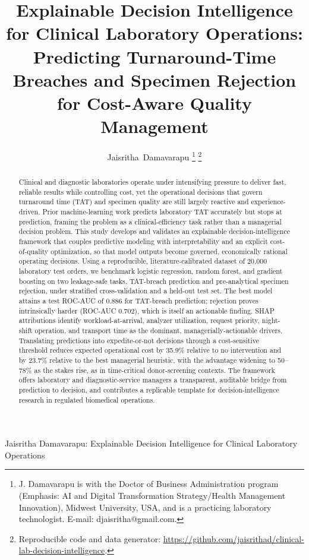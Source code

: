 \documentclass[journal]{IEEEtran}
\begin{document}
\title{Explainable Decision Intelligence for Clinical Laboratory Operations:
Predicting Turnaround-Time Breaches and Specimen Rejection for Cost-Aware
Quality Management}

\author{Jaisritha~Damavarapu%
\thanks{J. Damavarapu is with the Doctor of Business Administration program
(Emphasis: AI and Digital Transformation Strategy/Health Management Innovation), Midwest University, USA,
and is a practicing laboratory technologist.
E-mail: djaisritha@gmail.com.}%
\thanks{Reproducible code and data generator:
\url{https://github.com/jaisrithad/clinical-lab-decision-intelligence}.}}

%
{Jaisritha Damavarapu: Explainable Decision Intelligence for Clinical Laboratory Operations}

\maketitle

\begin{abstract}
Clinical and diagnostic laboratories operate under intensifying pressure to
deliver fast, reliable results while controlling cost, yet the operational
decisions that govern turnaround time (TAT) and specimen quality are still
largely reactive and experience-driven. Prior machine-learning work predicts
laboratory TAT accurately but stops at prediction, framing the problem as a
clinical-efficiency task rather than a managerial decision problem. This study
develops and validates an explainable decision-intelligence framework that
couples predictive modeling with interpretability and an explicit cost-of-quality
optimization, so that model outputs become governed, economically rational
operating decisions. Using a reproducible, literature-calibrated dataset of
20{,}000 laboratory test orders, we benchmark logistic regression, random forest,
and gradient boosting on two leakage-safe tasks, TAT-breach prediction and
pre-analytical specimen rejection, under stratified cross-validation and a
held-out test set. The best model attains a test ROC-AUC of 0.886 for TAT-breach
prediction; rejection proves intrinsically harder (ROC-AUC 0.702), which is itself
an actionable finding. SHAP attributions identify workload-at-arrival, analyzer
utilization, request priority, night-shift operation, and transport time as the
dominant, managerially-actionable drivers. Translating predictions into
expedite-or-not decisions through a cost-sensitive threshold reduces expected
operational cost by 35.9\% relative to no intervention and by 23.7\% relative to
the best managerial heuristic, with the advantage widening to 50--78\% as the
stakes rise, as in time-critical donor-screening contexts. The framework offers
laboratory and diagnostic-service managers a transparent, auditable bridge from
prediction to decision, and contributes a replicable template for
decision-intelligence research in regulated biomedical operations.
\end{abstract}
\end{document}
